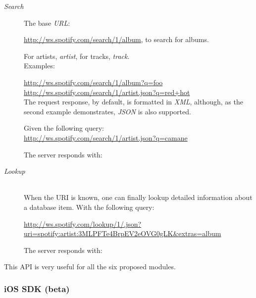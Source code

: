         \begin{description}
          \item[\emph{Search}] \hfill

            The base \emph{URL}:

            \url{http://ws.spotify.com/search/1/album}, to search for albums.

            For artists, \emph{artist}, for tracks, \emph{track}. \\

            Examples:

            \url{http://ws.spotify.com/search/1/album?q=foo} \\
            \url{http://ws.spotify.com/search/1/artist.json?q=red+hot} \\

            The request response, by default, is formatted in \emph{XML}, although, as the second example demonstrates, \emph{JSON} is also supported.

            Given the following query: \\
            \url{http://ws.spotify.com/search/1/artist.json?q=camane}

            The server responds with:

            

          \item[\emph{Lookup}] \hfill \\

            When the URI is known, one can finally lookup detailed information about a database item. With the following query:

            \sloppy
            \url{http://ws.spotify.com/lookup/1/.json?uri=spotify:artist:3MLPFTe4BrpEV2eOVG0gLK&extras=album}

            The server responds with:

            

        \end{description}

        This API is very useful for all the six proposed modules.


      \subsubsection{iOS SDK (beta)} %
      \label{sub:ios_sdk}
      
